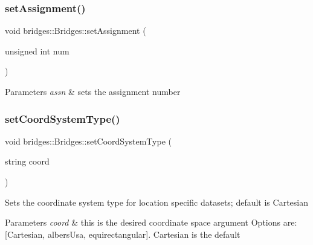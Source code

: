 \subsubsection{\texorpdfstring{set\+Assignment()}{setAssignment()}}
{\footnotesize\ttfamily void bridges\+::\+Bridges\+::set\+Assignment (\begin{DoxyParamCaption}\item[{unsigned int}]{num }\end{DoxyParamCaption})}


\begin{DoxyParams}{Parameters}
{\em assn} & sets the assignment number \\
\hline
\end{DoxyParams}
\mbox{\label{namespacebridges_1_1_bridges_ad00c07d3a028110424909081a94c4013}} 
\subsubsection{\texorpdfstring{set\+Coord\+System\+Type()}{setCoordSystemType()}}
{\footnotesize\ttfamily void bridges\+::\+Bridges\+::set\+Coord\+System\+Type (\begin{DoxyParamCaption}\item[{string}]{coord }\end{DoxyParamCaption})}

Sets the coordinate system type for location specific datasets; default is Cartesian


\begin{DoxyParams}{Parameters}
{\em coord} & this is the desired coordinate space argument Options are\+: \mbox{[}\textquotesingle{}Cartesian\textquotesingle{}, \textquotesingle{}albers\+Usa\textquotesingle{}, \textquotesingle{}equirectangular\textquotesingle{}\mbox{]}. \textquotesingle{}Cartesian\textquotesingle{} is the default \\
\hline
\end{DoxyParams}
\mbox{\label{namespacebridges_1_1_bridges_a7447e2d5808c492d26132690c1a639a7}} 

